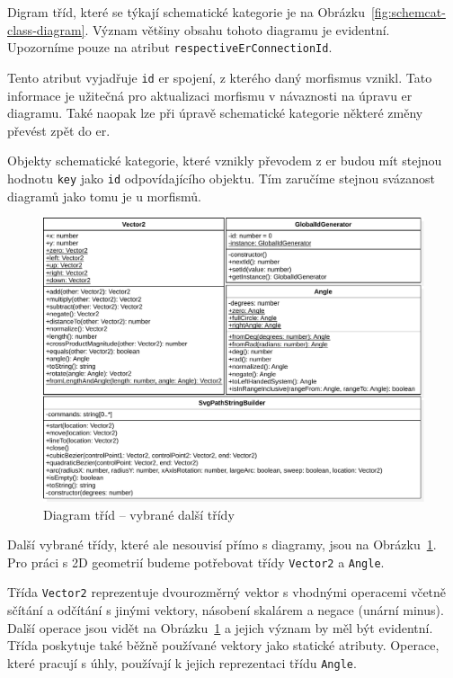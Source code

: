 Digram tříd, které se týkají schematické kategorie je na Obrázku~\ref{fig:schemcat-class-diagram}.
Význam většiny obsahu tohoto diagramu je evidentní.
Upozorníme pouze na atribut \texttt{respectiveErConnectionId}.

Tento atribut vyjadřuje \texttt{id} \acrshort{er} spojení, z kterého daný morfismus vznikl.
Tato informace je užitečná pro aktualizaci morfismu v návaznosti na úpravu \acrshort{er} diagramu.
Také naopak lze při úpravě schematické kategorie některé změny převést zpět do \acrshort{er}.

Objekty schematické kategorie, které vznikly převodem z \acrshort{er} budou mít stejnou hodnotu \texttt{key} jako \texttt{id} odpovídajícího objektu.
Tím zaručíme stejnou svázanost diagramů jako tomu je u morfismů.

\begin{figure}[!htb]
  \centering
  \includegraphics[width=\maxwidth{\textwidth}]{../img/diagrams/utils-class-diagram.pdf}
  \caption{Diagram tříd -- vybrané další třídy}
  \label{fig:utils-class-diagram}
\end{figure}

Další vybrané třídy, které ale nesouvisí přímo s diagramy, jsou na Obrázku~\ref{fig:utils-class-diagram}.
Pro práci s 2D geometrií budeme potřebovat třídy \texttt{Vector2} a \texttt{Angle}.

Třída \texttt{Vector2} reprezentuje dvourozměrný vektor s vhodnými operacemi včetně sčítání a odčítání s jinými vektory, násobení skalárem a negace (unární minus).
Další operace jsou vidět na Obrázku~\ref{fig:utils-class-diagram} a jejich význam by měl být evidentní.
Třída poskytuje také běžně používané vektory jako statické atributy.
Operace, které pracují s úhly, používají k jejich reprezentaci třídu \texttt{Angle}.

